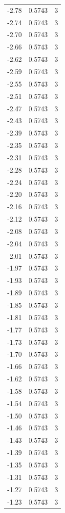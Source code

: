 \begin{longtable}{lrr}
  -2.78 & 0.5743 & 3 \\
  -2.74 & 0.5743 & 3 \\
  -2.70 & 0.5743 & 3 \\
  -2.66 & 0.5743 & 3 \\
  -2.62 & 0.5743 & 3 \\
  -2.59 & 0.5743 & 3 \\
  -2.55 & 0.5743 & 3 \\
  -2.51 & 0.5743 & 3 \\
  -2.47 & 0.5743 & 3 \\
  -2.43 & 0.5743 & 3 \\
  -2.39 & 0.5743 & 3 \\
  -2.35 & 0.5743 & 3 \\
  -2.31 & 0.5743 & 3 \\
  -2.28 & 0.5743 & 3 \\
  -2.24 & 0.5743 & 3 \\
  -2.20 & 0.5743 & 3 \\
  -2.16 & 0.5743 & 3 \\
  -2.12 & 0.5743 & 3 \\
  -2.08 & 0.5743 & 3 \\
  -2.04 & 0.5743 & 3 \\
  -2.01 & 0.5743 & 3 \\
  -1.97 & 0.5743 & 3 \\
  -1.93 & 0.5743 & 3 \\
  -1.89 & 0.5743 & 3 \\
  -1.85 & 0.5743 & 3 \\
  -1.81 & 0.5743 & 3 \\
  -1.77 & 0.5743 & 3 \\
  -1.73 & 0.5743 & 3 \\
  -1.70 & 0.5743 & 3 \\
  -1.66 & 0.5743 & 3 \\
  -1.62 & 0.5743 & 3 \\
  -1.58 & 0.5743 & 3 \\
  -1.54 & 0.5743 & 3 \\
  -1.50 & 0.5743 & 3 \\
  -1.46 & 0.5743 & 3 \\
  -1.43 & 0.5743 & 3 \\
  -1.39 & 0.5743 & 3 \\
  -1.35 & 0.5743 & 3 \\
  -1.31 & 0.5743 & 3 \\
  -1.27 & 0.5743 & 3 \\
  -1.23 & 0.5743 & 3 \\

\end{longtable}
